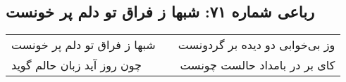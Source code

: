 \begin{center}
\section*{رباعی شماره ۷۱: شبها ز فراق تو دلم پر خونست}
\label{sec:sh071}
\begin{longtable}{l p{0.5cm} r}
شبها ز فراق تو دلم پر خونست
&&
وز بی‌خوابی دو دیده بر گردونست
\\
چون روز آید زبان حالم گوید
&&
کای بر در بامداد حالست چونست
\\
\end{longtable}
\end{center}
